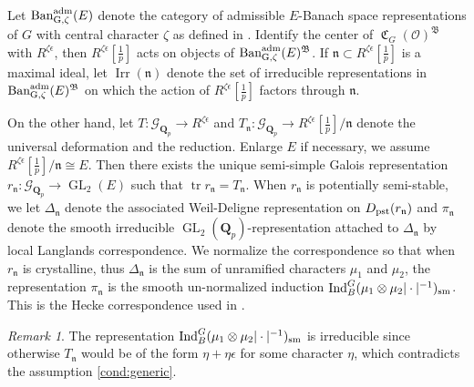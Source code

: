 \documentclass[leqno]{amsart}
\theoremstyle{definition}
\theoremstyle{remark}
\newtheorem{rem}[thm]{Remark}
\newcommand{\oo}{\mathcal{O}}
\newcommand{\Qp}{\mathbf{Q}_p}
\DeclareMathOperator{\Ind}{Ind}
\DeclareMathOperator{\GL}{GL}
\DeclareMathOperator{\mtr}{tr}
\newcommand{\pst}{\textnormal{pst}}
\newcommand{\fn}{\mathfrak{n}}
\DeclareMathOperator{\fC}{\mathfrak{C}} %
\DeclareMathOperator{\Ban}{\textnormal{Ban}_{G,\zeta}^{\adm}}
\DeclareMathOperator{\Irr}{Irr}
\newcommand{\Gp}{\mathcal{G}_{\Qp}} %
\newcommand{\B}{\mathfrak B} %
\newcommand{\sm}{\textnormal{sm}}
\newcommand{\adm}{\textnormal{adm}}
\begin{document}
Let $\Ban(E)$
denote the category of admissible $E$-Banach space
representations of $G$ with central character $\zeta$
as defined in \cite{pask}.
Identify the center of $\fC_G(\oo)^\B$ with $R^{\zeta\epsilon}$,
then $R^{\zeta\epsilon}[\frac{1}{p}]$ acts on objects of $\Ban(E)^{\B}$.
If $\fn\subset R^{\zeta\epsilon}[\frac{1}{p}]$ 
is a maximal ideal,
let $\Irr(\fn)$ denote the set of
irreducible representations in  $\Ban(E)^{\B}$
on which the action of $R^{\zeta\epsilon}[\frac{1}{p}]$ 
factors through $\fn$.

On the other hand,
let $T\colon \Gp\to R^{\zeta\epsilon}$ 
and $T_\fn\colon \Gp\to R^{\zeta\epsilon}[\frac{1}{p}]/\fn$ 
denote the universal deformation and 
the reduction.
Enlarge $E$ if necessary,
we assume $R^{\zeta\epsilon}[\frac{1}{p}]/\fn\cong E$.
Then there exists 
the unique semi-simple Galois representation
$r_{\fn}\colon \Gp\to \GL_2(E)$
such that $\mtr r_{\fn}=T_{\fn}$.
When $r_\fn$ is potentially semi-stable,
we let $\Delta_{\fn}$ denote
the associated Weil-Deligne representation 
on $D_{\pst}(r_\fn)$
and $\pi_{\fn}$ denote the smooth irreducible
$\GL_2(\Qp)$-representation attached to $\Delta_{\fn}$
by local Langlands correspondence.
We normalize the correspondence so that 
when $r_{\fn}$ is crystalline, 
thus $\Delta_{\fn}$
is the sum of unramified characters $\mu_1$ and $\mu_2$,
the representation $\pi_\fn$ 
is the smooth un-normalized induction
$\Ind_B^G(\mu_1\otimes\mu_2|\cdot|^{-1})_{\sm}$.
This is the Hecke correspondence used in \cite{pan}.

\begin{rem}
	The representation 
	$\Ind_B^G(\mu_1\otimes\mu_2|\cdot|^{-1})_{\sm}$
	is irreducible since otherwise
	$T_\fn$ would be of the form
	$\eta+\eta\epsilon$ for some character  $\eta$,
    which contradicts 
    the assumption \eqref{cond:generic}.
\end{rem}
\end{document}
